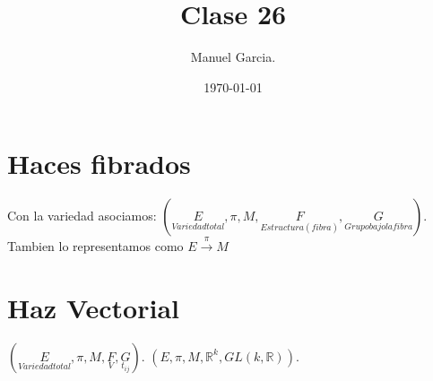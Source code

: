 \documentclass{article}
\title{Clase 26 }
\author{Manuel Garcia.}
\date{\today}
\begin{document}
\maketitle

\section{Haces fibrados }
Con la variedad asociamos: $(\underset{Variedad total }{E }, \pi, M, \underset{Estructura (fibra) }{F },\underset{Grupo bajo la fibra }{G })$. Tambien lo representamos como $ E \overset{\pi }{\rightarrow }M  $
\section{Haz Vectorial }
$(\underset{Variedad total }{E }, \pi, M, \underset{V }{F },\underset{t _{ij } }{G })$. $(E , \pi, M, \mathbb{R}^ {k },GL(k, \mathbb{R}))$.
\end{document}
